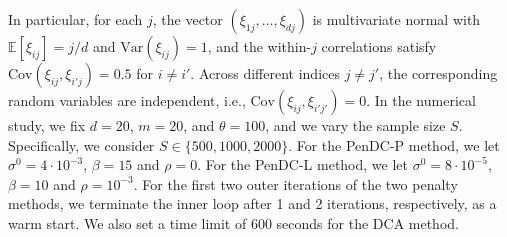 \documentclass[11pt]{article}
\begin{document}
In particular, for each $j$, the vector $(\xi_{1j},\ldots,\xi_{dj})$ is multivariate normal with $\mathbb{E}[\xi_{ij}]=j/d$ and $\mathrm{Var}(\xi_{ij})=1$, and the within-$j$ correlations satisfy $\mathrm{Cov}(\xi_{ij},\xi_{i'j})=0.5$ for $i\neq i'$. Across different indices $j\neq j'$, the corresponding random variables are independent, i.e., $\mathrm{Cov}(\xi_{ij},\xi_{i'j'})=0$. In the numerical study, we fix $d=20$, $m=20$, and $\theta=100$, and we vary the sample size $S$. Specifically, we consider $S\in\{500,1000,2000\}$. For the PenDC-P method, we let $\sigma^0 = 4\cdot10^{-3}$, $\beta =15$ and $\rho = 0$. For the PenDC-L method, we let $\sigma^0 = 8\cdot10^{-5}$, $\beta =10$ and $\rho = 10^{-3}$. For the first two outer iterations of the two penalty methods, we terminate the inner loop after 1 and 2 iterations, respectively, as a warm start. We also set a time limit of 600 seconds for the DCA method.
\end{document}
